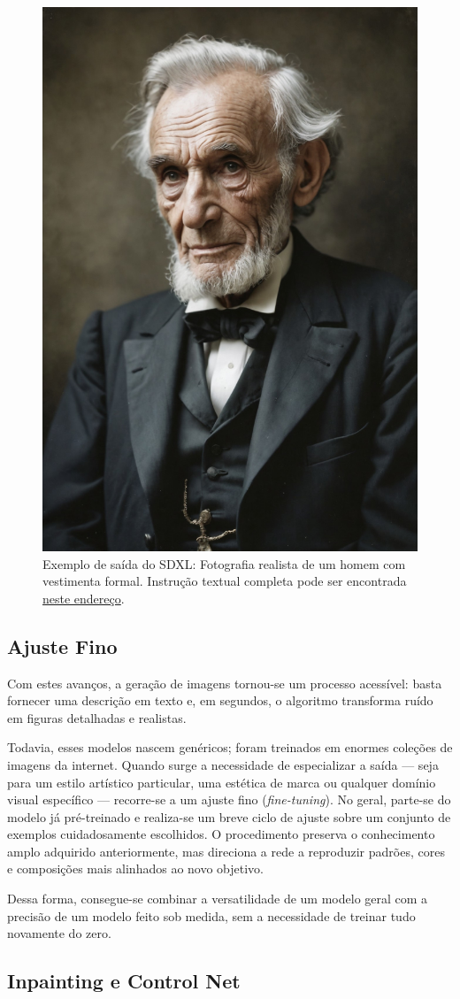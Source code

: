 \documentclass[12pt, %
openright, 
oneside, %
a4paper,    %
brazil]{facom-ufu-abntex2}
\begin{document}
\begin{figure}[H]
    \centering
	\includegraphics[width=0.35\linewidth]{figuras/sdxl-sample-1.jpeg}
	\caption[Exemplo realista de saída do SDXL]{Exemplo de saída do SDXL: Fotografia realista de um homem com vestimenta formal. Instrução textual completa pode ser encontrada \href{https://civitai.com/images/45346112}{neste endereço}.}
	\label{fig:sdxlSample1}
\end{figure}

\subsection*{Ajuste Fino}

Com estes avanços, a geração de imagens tornou-se um processo acessível: basta fornecer uma descrição em texto e, em segundos, o algoritmo transforma ruído em figuras detalhadas e realistas.

Todavia, esses modelos nascem genéricos; foram treinados em enormes coleções de imagens da internet. Quando surge a necessidade de especializar a saída — seja para um estilo artístico particular, uma estética de marca ou qualquer domínio visual específico — recorre-se a um ajuste fino (\emph{fine-tuning}). No geral, parte-se do modelo já pré-treinado e realiza-se um breve ciclo de ajuste sobre um conjunto de exemplos cuidadosamente escolhidos. O procedimento preserva o conhecimento amplo adquirido anteriormente, mas direciona a rede a reproduzir padrões, cores e composições mais alinhados ao novo objetivo.

Dessa forma, consegue-se combinar a versatilidade de um modelo geral com a precisão de um modelo feito sob medida, sem a necessidade de treinar tudo novamente do zero.

\subsection*{Inpainting e Control Net}
\end{document}

